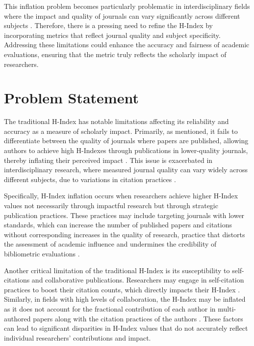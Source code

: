 This inflation problem becomes particularly problematic in interdisciplinary
fields where the impact and quality of journals can vary significantly
across different subjects \cite{hirsch2005index,waltman2012inconsistency}.
Therefore, there is a pressing need to refine the H-Index by incorporating
metrics that reflect journal quality and subject specificity. Addressing these
limitations could enhance the accuracy and fairness of academic evaluations,
ensuring that the metric truly reflects the scholarly impact of researchers.

\section{Problem Statement}
The traditional H-Index has notable limitations affecting its reliability
and accuracy as a measure of scholarly impact. Primarily, as mentioned, it
fails to differentiate between the quality of journals where papers are
published, allowing authors to achieve high H-Indexes through publications in
lower-quality journals, thereby inflating their perceived impact
\cite{costas2007h,tonta2020monetary}. This issue is exacerbated in
interdisciplinary research, where measured journal quality can vary widely
across different subjects, due to variations in citation practices
\cite{costas2007h,norris2010h}.

Specifically, H-Index inflation occurs when researchers achieve higher H-Index
values not necessarily through impactful research but through strategic
publication practices. These practices may include targeting journals with
lower standards, which can increase the number of published papers and
citations without corresponding increases in the quality of research, practice that distorts
the assessment of academic influence and undermines the
credibility of bibliometric evaluations \cite{tonta2020monetary}.

Another critical limitation of the traditional H-Index is its susceptibility to
self-citations and collaborative publications. Researchers may engage in
self-citation practices to boost their citation counts, which directly impacts
their H-Index
\cite{hirsch2005index,schreiber2008share,costas2007h,waltman2012inconsistency,norris2010h,bartneck2011detecting,zhivotovsky2008self}.
Similarly, in fields with high levels of collaboration, the H-Index may be
inflated as it does not account for the fractional contribution of each author
in multi-authored papers along with the citation practices of the authors
\cite{schreiber2008share,costas2007h,waltman2012inconsistency,norris2010h,zhivotovsky2008self}.
These factors can lead to significant disparities in H-Index values that do not
accurately reflect individual researchers' contributions and impact.


